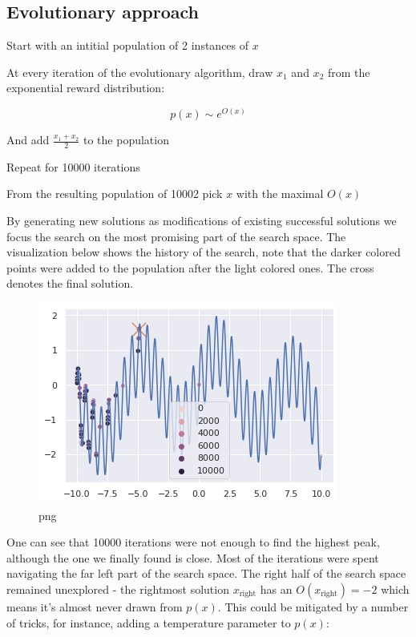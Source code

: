 \subsection{Evolutionary approach}

Start with an intitial population of 2 instances of $ x $

At every iteration of the evolutionary algorithm, draw $ x_1 $ and $ x_2 $ from the exponential reward distribution:

\begin{equation}
p(x) \sim e^{O(x)}
\end{equation}

And add $ \frac{x_1 + x_2}{2} $ to the population

Repeat for 10000 iterations


From the resulting population of 10002 pick $ x $ with the maximal $ O(x) $



By generating new solutions as modifications of existing successful solutions we focus the search on the most promising part of the search space. The visualization below shows the history of the search, note that the darker colored points were added to the population after the light colored ones. The cross denotes the final solution.


    
\begin{figure}
    \centering
    \includegraphics[width=0.8\linewidth]{images/neuropt2.png}
    \caption{png}
\end{figure}

    


One can see that 10000 iterations were not enough to find the highest peak, although the one we finally found is close. Most of the iterations were spent navigating the far left part of the search space. The right half of the search space remained unexplored - the rightmost solution $ x_\text{right} $ has an $ O(x_\text{right})=-2 $ which means it's almost never drawn from $ p(x) $. This could be mitigated by a number of tricks, for instance, adding a temperature parameter to $ p(x) $:

